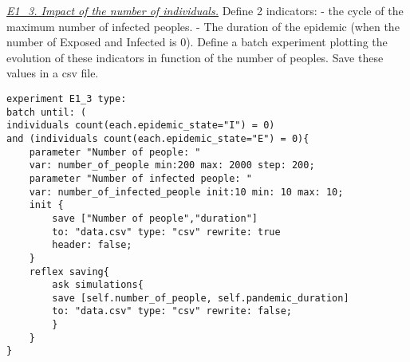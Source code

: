 \documentclass{article}
\begin{document}
\underline{\textit{E1\_3. Impact of the number of individuals.}}
Define 2 indicators:
- the cycle of the maximum number of infected peoples.
- The duration of the epidemic (when the number of Exposed and Infected is
0).
Define a batch experiment plotting the evolution of these indicators in function
of the number of peoples. Save these values in a csv file.
\newline\newline
\begin{tcolorbox}
\begin{lstlisting}
experiment E1_3 type: 
batch until: (
individuals count(each.epidemic_state="I") = 0) 
and (individuals count(each.epidemic_state="E") = 0){
	parameter "Number of people: " 
	var: number_of_people min:200 max: 2000 step: 200;
	parameter "Number of infected people: " 
	var: number_of_infected_people init:10 min: 10 max: 10;
	init {
		save ["Number of people","duration"] 
		to: "data.csv" type: "csv" rewrite: true 
		header: false;
	}
	reflex saving{
		ask simulations{
		save [self.number_of_people, self.pandemic_duration] 
		to: "data.csv" type: "csv" rewrite: false;
		}
	}
}
\end{lstlisting}
\end{tcolorbox}
\end{document}
